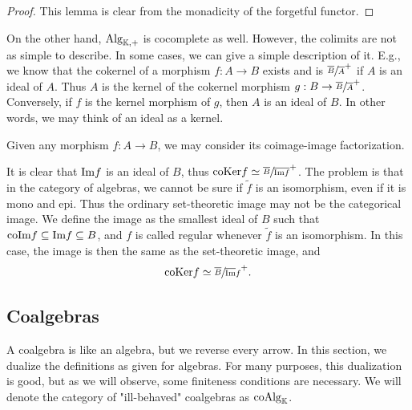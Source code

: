 \documentclass[../thesis.tex]{subfiles}
\begin{document}
                \begin{proof}
                    This lemma is clear from the monadicity of the forgetful functor.
                \end{proof}

                On the other hand, $\tt{Alg}_{\mathbb{K},+}$ is cocomplete as well. However, the colimits are not as simple to describe. In some cases, we can give a simple description of it. E.g., we know that the cokernel of a morphism $f: A \rightarrow B$ exists and is $\sfrac{\overline{B}}{\overline{A}}^+$ if $A$ is an ideal of $A$. Thus $A$ is the kernel of the cokernel morphism $g : B \rightarrow \sfrac{\overline{B}}{\overline{A}}^+$. Conversely, if $f$ is the kernel morphism of $g$, then $A$ is an ideal of $B$. In other words, we may think of an ideal as a kernel.
                
                Given any morphism $f: A \rightarrow B$, we may consider its coimage-image factorization.
                \begin{center}
                \end{center}
                It is clear that $\tt{Im}f$ is an ideal of $B$, thus $\tt{coKer}f \simeq \sfrac{\overline{B}}{\overline{\tt{Im}f}}^+$. The problem is that in the category of algebras, we cannot be sure if $\widetilde{f}$ is an isomorphism, even if it is mono and epi. Thus the ordinary set-theoretic image may not be the categorical image. We define the image as the smallest ideal of $B$ such that $\tt{coIm}f \subseteq \tt{Im}f \subseteq B$, and $f$ is called regular whenever $\widetilde{f}$ is an isomorphism. In this case, the image is then the same as the set-theoretic image, and
                \begin{align*}
                    \tt{coKer}f \simeq \sfrac{\overline{B}}{\overline{\tt{Im}}f}^+\tt{.}
                \end{align*}

    \subsection{Coalgebras}
            A coalgebra is like an algebra, but we reverse every arrow. In this section, we dualize the definitions as given for algebras. For many purposes, this dualization is good, but as we will observe, some finiteness conditions are necessary. We will denote the category of "ill-behaved" coalgebras as $\tt{coAlg}_\mathbb{K}$.
\end{document}
